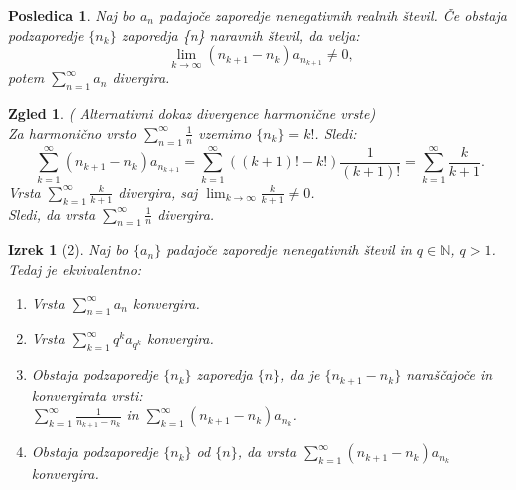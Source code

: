 \documentclass{beamer}
\newtheorem{izrek}{Izrek}
\newtheorem{posledica}{Posledica}
\newtheorem{zgled}{Zgled}
\begin{document}
\begin{frame}
    \begin{posledica}
        Naj bo ${a_n}$ padajoče zaporedje nenegativnih realnih števil.
        Če obstaja podzaporedje $\{n_k\}$ zaporedja \{n\} naravnih števil, da velja:
        \[
            \lim_{k \to \infty} (n_{k+1} - n_k)a_{n_{k+1}} \neq 0 \text{,}
        \] 
        potem $\sum_{n = 1}^{\infty}{a_n}$ divergira.
    \end{posledica}
\end{frame}



\begin{frame}
    \begin{zgled}
        ( Alternativni dokaz divergence harmonične vrste)\\
        Za harmonično vrsto $\sum_{n = 1}^{\infty}{\frac{1}{n}}$ vzemimo $\{n_k\} = k!$. Sledi:
        \pause
        \[
            \sum_{k = 1}^{\infty}{(n_{k+1} - n_k)a_{n_{k + 1}}} =
            \sum_{k = 1}^{\infty}{((k + 1)! - k!) \frac{1}{(k+1)!}}=
            \sum_{k = 1}^{\infty}{\frac{k}{k + 1}} \text{.}
        \]
        \pause
        Vrsta $\sum_{k = 1}^{\infty}{\frac{k}{k + 1}}$ divergira,
        saj $\lim_{k \to \infty}{\frac{k}{k + 1}} \neq 0$. \\
        \vspace{0.3 cm}
        Sledi, da vrsta $\sum_{n = 1}^{\infty}{\frac{1}{n}}$ divergira.
    \end{zgled}
\end{frame}


\begin{frame}
    \begin{izrek}[2]
        Naj bo $\{a_n\}$ padajoče zaporedje nenegativnih števil in $ q \in {\mathbb{N}}$, $q > 1$. Tedaj je ekvivalentno:
        \begin{enumerate}
            \item Vrsta $\sum_{n = 1}^{\infty}{a_n}$ konvergira.
            \pause
            \item Vrsta $\sum_{k = 1}^{\infty}{q^ka_{q^k}}$ konvergira.
            \pause
            \item Obstaja podzaporedje $\{n_k\}$ zaporedja $\{n\}$, da je $\{n_{k+1} - n_k\}$ 
            naraščajoče in konvergirata vrsti:\\
            $\sum_{k = 1}^{\infty}{\frac{1}{n_{k+1} - n_k}}$ in 
            $\sum_{k = 1}^{\infty}{(n_{k+1} - n_k)a_{n_k}}$. 
            \pause
            \item Obstaja podzaporedje $\{n_k\}$ od $\{n\}$, da vrsta $\sum_{k = 1}^{\infty}{(n_{k+1} - n_k)a_{n_k}}$ konvergira.
        \end{enumerate}
    \end{izrek}    
\end{frame}
\end{document}
